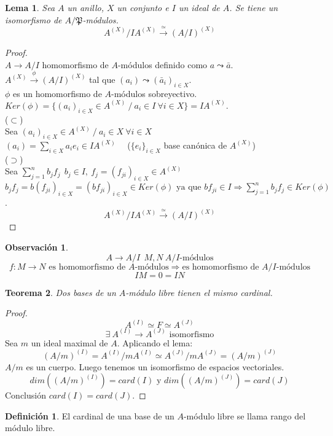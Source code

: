\documentclass{article}
\theoremstyle{theorem-style}  %
\newtheorem{theorem}{Teorema}[section]  %
\newtheorem{lemma}[theorem]{Lema}
\theoremstyle{definition}
\newtheorem{definition}{Definición}[section]
\newtheorem*{observation}{Observación} %
\theoremstyle{example-style}
\begin{document}
\begin{lemma}
	Sea $A$ un anillo, $X$ un conjunto e $I$ un ideal de $A$. Se tiene un isomorfismo de $A/\mathfrak{P}$-módulos.
	\[A^{(X)}/IA^{(X)} \xrightarrow{\ \simeq\ }(A/I)^{(X)}\]
\end{lemma}

\begin{proof} \ \\
	$A\rightarrow A/I$ homomorfismo de $A$-módulos definido como $a \leadsto \bar{a}$.\\
	$A^{(X)} \xrightarrow{\ \phi\ }(A/I)^{(X)}$ tal que $(a_i)\leadsto (\bar{a}_i)_{i \in X}.$\\
	$\phi$ es un homomorfismo de $A$-módulos sobreyectivo.\\
	$Ker(\phi)=\{(a_i)_{i\in X} \in A^{(X)} \ / \ a_i \in I \ \forall i \in X\} = IA^{(X)}.$\\
	($\subset$)\\
	Sea $(a_i)_{i\in X} \in A^{(X)} \ / \ a_i \in X \ \forall i \in X$ \\
	$(a_i)=\sum_{i \in X}a_ie_i \in IA^{(X)}$ \ \ ($\{e_i\}_{i\in X}$ base canónica de $A^{(X)}$) \\
	($\supset$)\\
	Sea $\sum_{j=1}^nb_jf_j \ \ b_j \in I, \ f_j=(f_{ji})_{i\in X} \in A^{(X)}$\\
	$b_jf_j=b(f_{ji})_{i\in X} = (bf_{ji})_{i\in X} \in Ker(\phi) \text{ ya que }bf_{ji} \in I \Rightarrow \sum_{j=1}^nb_jf_j \in Ker(\phi)$.\\
	\[A^{(X)}/IA^{(X)} \xrightarrow{\ \simeq \ } (A/I)^{(X)} \]
\end{proof}

\begin{observation}
	\[A\rightarrow A/I \ \  M,N \  A/I\text{-módulos}\]
	\[f:M\rightarrow N \text{ es homomorfismo de $A$-módulos} \Rightarrow \text{es homomorfismo de $A/I$-módulos}\]
	\[IM=0=IN\]
\end{observation}

\begin{theorem}
	Dos bases de un $A$-módulo libre tienen el mismo cardinal.
\end{theorem}

\begin{proof}
	\[A^{(I)} \simeq F \simeq A^{(J)}\]
	\[\exists \  A^{(I)} \rightarrow A^{(J)} \text{ isomorfismo}\]
	Sea $m$ un ideal maximal de $A$. Aplicando el lema:
	\[ (A/m)^{(I)} = A^{(I)}/mA^{(I)} \simeq A^{(J)}/mA^{(J)} = (A/m)^{(J)} \]
	$A/m$ es un cuerpo. Luego tenemos un isomorfismo de espacios vectoriales.
	\[dim((A/m)^{(I)})=card(I) \text{ y } dim((A/m)^{(J)})=card(J)\]
	Conclusión $card(I)=card(J)$.
\end{proof}

\begin{definition}
	El cardinal de una base de un $A$-módulo libre se llama rango del módulo libre.
\end{definition}
\end{document}

